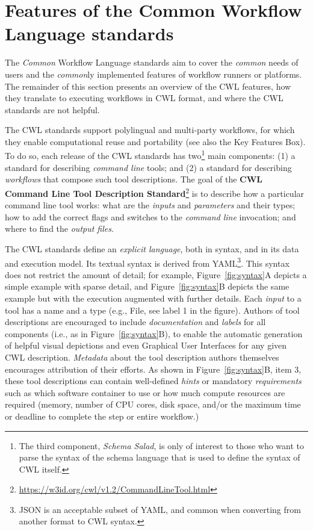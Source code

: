 \section{Features of the Common Workflow Language standards}\label{sec:features}\label{sec:design}

The \textit{Common} Workflow Language standards aim to cover the \textit{common} needs of users and the \textit{common}ly implemented features of workflow runners or platforms. The remainder of this section presents an overview of the CWL features, how they translate to executing workflows in CWL format, and where the CWL standards are not helpful.

The CWL standards support polylingual and multi-party workflows, for which they enable computational reuse and portability (see also the Key Features Box). To do so, each release of the CWL standards has two\footnote{The third component, \textit{Schema Salad}, is only of interest to those who want to parse the syntax of the schema language that is used to define the syntax of CWL itself.} main components: (1) a standard for describing \textit{command line} tools; and (2) a standard for describing \textit{workflows} that compose such tool descriptions. The goal of the \textbf{CWL Command Line Tool Description Standard}\footnote{\url{https://w3id.org/cwl/v1.2/CommandLineTool.html}} is to describe how a particular command line tool works: what are the \textit{inputs} and \textit{parameters} and their types; how to add the correct flags and switches to the \textit{command line} invocation; and where to find the \textit{output files}. 

The CWL standards define an \textit{explicit language}, both in syntax, and in its data and execution model. Its textual syntax is derived from YAML\footnote{JSON is an acceptable subset of YAML, and common when converting from another format to CWL syntax.}. This syntax does not restrict the amount of detail; for example, Figure~\ref{fig:syntax}A depicts a simple example with sparse detail, and Figure~\ref{fig:syntax}B depicts the same example but with the execution augmented with further details. Each \textit{input} to a tool has a name and a type (e.g., File, see label 1 in the figure). %
Authors of tool descriptions are encouraged to include \textit{documentation} and \textit{labels} for all components (i.e., as in Figure~\ref{fig:syntax}B), to enable the automatic generation of helpful visual depictions and even Graphical User Interfaces %
for any given CWL description. \textit{Metadata} about the tool description authors themselves encourages attribution of their efforts. As shown in Figure~\ref{fig:syntax}B, item 3, these tool descriptions can contain well-defined \textit{hints} or mandatory \textit{requirements} such as which software container to use or how much compute resources are required (memory, number of CPU cores, disk space, and/or the maximum time or deadline to complete the step or entire workflow.)


